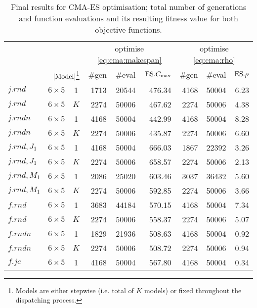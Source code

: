 \begin{table}[t!]\centering 
\caption[Final results for CMA-ES optimisation]{Final results for CMA-ES 
    optimisation; total number of generations and function evaluations and its 
    resulting fitness value for both objective functions.}\label{tbl:cma:run}
\vspace{-3pt} \noindent %
\begin{minipage}{\textwidth}\centering
\begin{tabular}{llcrrrrrr}
    \toprule
    & & & \multicolumn{3}{c}{optimise \cref{eq:cma:makespan}} & 
    \multicolumn{3}{c}{optimise \cref{eq:cma:rho}} \\
    \multicolumn{3}{r}{\Problem{\train} \quad 
    $\lvert\text{Model}\rvert$\footnote{Models are either stepwise (i.e. 
        total of $K$ models) or fixed throughout the dispatching 
        process.}} &
        \#gen & \#eval & $\text{ES}.{C_{\max}}$ & \#gen & \#eval & $\text{ES}.{\rho}$ \\ 
    \midrule
    $j.rnd$ & $6\times5$ & 1 & 1713 & 20544 & 476.34 & 4168 & 50004 & 6.23 \\ 
    $j.rnd$ & $6\times5$ & $K$ & 2274 & 50006 & 467.62 & 2274 & 50006 & 4.38 \\ 
    $j.rndn$ & $6\times5$ & 1 & 4168 & 50004 & 442.99 & 4168 & 50004 & 8.28 \\ 
    $j.rndn$ & $6\times5$ & $K$ & 2274 & 50006 & 435.87 & 2274 & 50006 & 6.60 
    \\ 
    $j.rnd,J_1$ & $6\times5$ & 1 & 4168 & 50004 & 666.03 & 1867 & 22392 & 3.26 
    \\ 
    $j.rnd,J_1$ & $6\times5$ & $K$ & 2274 & 50006 & 658.57 & 2274 & 50006 & 
    2.13 \\ 
    $j.rnd,M_1$ & $6\times5$ & 1 & 2086 & 25020 & 603.46 & 3037 & 36432 & 5.60 
    \\ 
    $j.rnd,M_1$ & $6\times5$ & $K$ & 2274 & 50006 & 592.85 & 2274 & 50006 & 
    3.66 \\ 
    $f.rnd$ & $6\times5$ & 1 & 3683 & 44184 & 570.15 & 4168 & 50004 & 7.34 \\ 
    $f.rnd$ & $6\times5$ & $K$ & 2274 & 50006 & 558.37 & 2274 & 50006 & 5.07 \\ 
    $f.rndn$ & $6\times5$ & 1 & 1829 & 21936 & 508.63 & 4168 & 50004 & 0.92 \\ 
    $f.rndn$ & $6\times5$ & $K$ & 2274 & 50006 & 508.72 & 2274 & 50006 & 0.94 
    \\ 
    $f.jc$ & $6\times5$ & 1 & 4168 & 50004 & 567.80 & 4168 & 50004 & 0.34 \\ 

\end{tabular}
\end{minipage}
\end{table}
